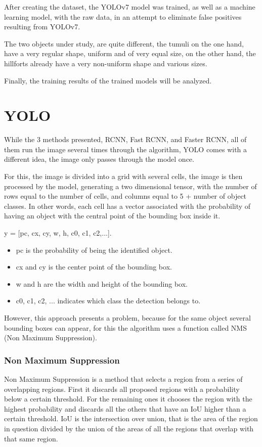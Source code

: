 After creating the dataset, the YOLOv7 model was trained, as well as a
machine learning model, with the raw data, in an attempt to eliminate false positives resulting from YOLOv7.

The two objects under study, are quite different, the tumuli on the one hand, have a very regular shape, uniform and of very equal size, on the other hand, the hillforts already have a very non-uniform shape and various sizes.

Finally, the training results of the trained models will be analyzed.


\section{YOLO}
While the 3 methods presented, RCNN, Fast RCNN, and Faster RCNN, all of them run the image several times through the algorithm, YOLO comes with a different idea, the image only passes through the model once.

For this, the image is divided into a grid\cite{yolodeepdive} with several cells, the image is then processed by the model, generating a two dimensional tensor, with the number of rows equal to the number of cells, and columns equal to 5 + number of object classes. In other words, each cell has a vector associated with the probability of having an object with the central point of the bounding box inside it.

y = [pc, cx, cy, w, h, c0, c1, c2,...].

\begin{itemize}
    \item pc is the probability of being the identified object.
    \item cx and cy is the center point of the bounding box.
    \item w and h are the width and height of the bounding box.
    \item c0, c1, c2, ... indicates which class the detection belongs to.
\end{itemize}

However, this approach presents a problem, because for the same object several bounding boxes can appear, for this the algorithm uses a function called NMS (Non Maximum Suppression).

\subsubsection{Non Maximum Suppression}
Non Maximum Suppression \cite{nonmaxsurpression} is a method that selects a region from a series of overlapping regions. First it discards all proposed regions with a probability below a certain threshold. For the remaining ones it chooses the region with the highest probability and discards all the others that have an IoU higher than a certain threshold.
IoU is the intersection over union, that is the area of the region in question divided by the union of the areas of all the regions that overlap with that same region.


